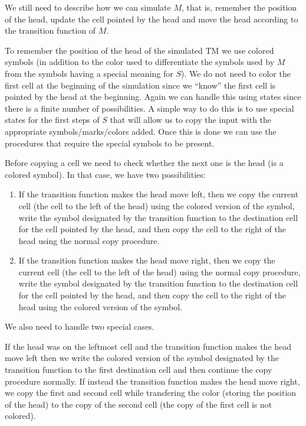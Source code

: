 \documentclass{article}
\newcommand{\TM}{TM}
\begin{document}
We still need to describe how we can simulate \(M\), that is, remember the
position of the head, update the cell pointed by the head and move the head
according to the transition function of \(M\).

To remember the position of the head of the simulated \TM{} we use
colored symbols (in addition to the color used to differentiate the symbols
used by \(M\) from the symbols having a special meaning for \(S\)).
We do not need to color the first cell at the beginning of
the simulation since we ``know'' the first cell is pointed by the head at the
beginning. Again we can handle this using states since there is a finite number
of possibilities. A simple way to do this is to use special states for the
first steps of \(S\) that will allow us to copy the input with the
appropriate symbols/marks/colors added. Once this is done we can use the
procedures that require the special symbols to be present.

Before copying a cell we need to check whether the next one is the head (is a
colored symbol).
In that case, we have two possibilities:
\begin{enumerate}
\item If the transition function makes the head move left, then
we copy the current cell (the cell to the left of the
head) using the colored version of the symbol, write the symbol designated by
the transition function to the destination cell for the
cell pointed by the head, and then copy the cell to the right of the head
using the normal copy procedure.
\item If the transition function makes the head move right, then
we copy the current cell (the cell to the left of the
head) using the normal copy procedure, write the symbol designated by
the transition function to the destination cell for the
cell pointed by the head, and then copy the cell to the right of the head
using the colored version of the symbol.
\end{enumerate}

We also need to handle two special cases.

If the head was on the leftmost cell and the transition function makes the
head move left then we write the colored version of the symbol designated by
the transition function to the first destination cell and then continue the
copy procedure normally. If instead the transition function makes the head move
right, we copy the first and second cell while transfering the color
(storing the position of the head) to the copy of the second cell (the copy of the first
cell is not colored).
\end{document}
